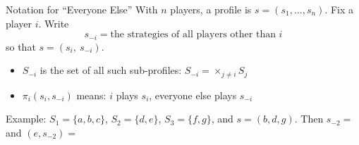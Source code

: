 \begin{frame}{Notation for ``Everyone Else''}
With $n$ players, a profile is $s=(s_1,\ldots,s_n)$.
\bsk
Fix a player $i$. Write
$$s_{-i}=\text{the strategies of all players other than } i$$
so that $s=(s_i,\ s_{-i})$.
\bsk
\begin{itemize}
    \item $S_{-i}$ is the set of all such sub-profiles: $S_{-i}=\times_{j\ne i}S_j$
    \item $\pi_i(s_i,s_{-i})$ means: $i$ plays $s_i$, everyone else plays $s_{-i}$
\end{itemize}
\vfill
Example: $S_1=\{a,b,c\}$, $S_2=\{d,e\}$, $S_3=\{f,g\}$, and $s=(b,d,g)$.
\bsk
Then $s_{-2}=$ \underline{\hspace{1.2in}} \hspace{0.3in}\\and $(e,s_{-2})=$ \underline{\hspace{1.2in}}
\end{frame}


